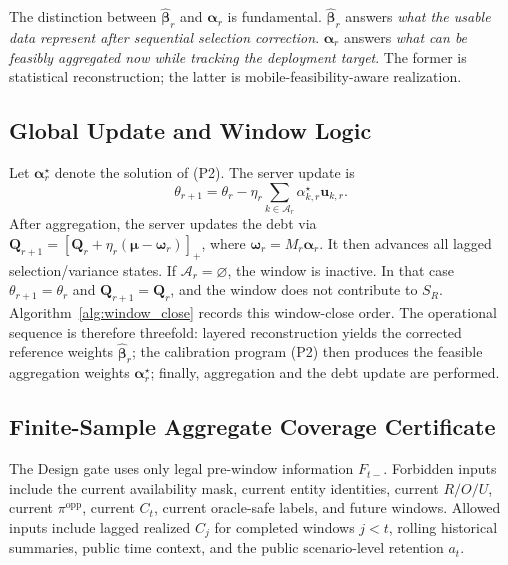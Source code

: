 \documentclass[letterpaper,journal]{IEEEtran}
\begin{document}
The distinction between
$\widehat{\boldsymbol\beta}_r$ and $\boldsymbol\alpha_r$ is fundamental.
$\widehat{\boldsymbol\beta}_r$ answers \emph{what the usable data
represent after sequential selection correction}.  $\boldsymbol\alpha_r$
answers \emph{what can be feasibly aggregated now while tracking the
deployment target}.  The former is statistical reconstruction; the
latter is mobile-feasibility-aware realization.

\subsection{Global Update and Window Logic}
\label{subsec:global_update}

Let $\boldsymbol\alpha_r^\star$ denote the solution of (P2).  The server update
is
\begin{equation}
 \theta_{r+1}
 =
 \theta_r
 -
 \eta_r
 \sum_{k\in\mathcal{A}_r}
 \alpha^\star_{k,r}\mathbf{u}_{k,r}.
 \label{eq:server_update}
\end{equation}
After aggregation, the server updates the debt via
$\mathbf{Q}_{r+1}=\left[\mathbf{Q}_r+\eta_r(\boldsymbol\mu-\boldsymbol\omega_r)\right]_+$,
where $\boldsymbol\omega_r=M_r\boldsymbol\alpha_r$.  It then advances all
lagged selection/variance states.  If
$\mathcal{A}_r=\varnothing$, the window is inactive.  In that case
$\theta_{r+1}=\theta_r$ and $\mathbf{Q}_{r+1}=\mathbf{Q}_r$, and the window
does not contribute to $S_R$.  Algorithm~\ref{alg:window_close}
records this window-close order.  The operational sequence is therefore
threefold: layered reconstruction yields the corrected reference weights
$\widehat{\boldsymbol\beta}_r$; the calibration program (P2) then produces the
feasible aggregation weights $\boldsymbol\alpha_r^\star$; finally, aggregation
and the debt update are performed.

\subsection{Finite-Sample Aggregate Coverage Certificate}
\label{subsec:agg_certificate_alg}

The Design gate uses only legal pre-window information $F_{t-}$.  Forbidden
inputs include the current availability mask, current entity identities,
current $R/O/U$, current $\pi^{\mathrm{opp}}$, current $C_t$, current
oracle-safe labels, and future windows.  Allowed inputs include lagged
realized $C_j$ for completed windows $j<t$, rolling historical summaries,
public time context, and the public scenario-level retention $a_t$.
\end{document}
